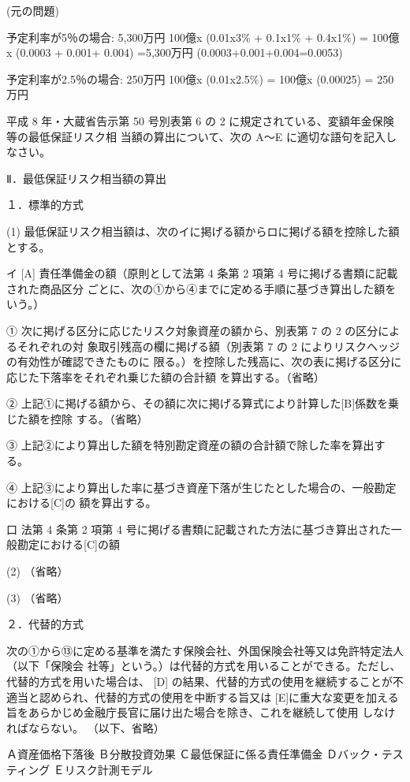 \documentclass[report,gutter=10mm,fore-edge=10mm,uplatex,dvipdfmx]{jlreq}
\begin{document}
(元の問題)

予定利率が5％の場合: 5,300万円
100億x (0.01x3\% + 0.1x1\% + 0.4x1\%) = 100億x (0.0003 + 0.001+ 0.004) =5,300万円
(0.0003+0.001+0.004=0.0053)

予定利率が2.5％の場合: 250万円
100億x (0.01x2.5\%) = 100億x (0.00025) = 250万円

平成 8 年・大蔵省告示第 50 号別表第 6 の 2 に規定されている、変額年金保険等の最低保証リスク相
当額の算出について、次の A～E に適切な語句を記入しなさい。

Ⅱ．最低保証リスク相当額の算出

１．標準的方式

(1) 最低保証リスク相当額は、次のイに掲げる額からロに掲げる額を控除した額とする。

イ [A] 責任準備金の額（原則として法第 4 条第 2 項第 4 号に掲げる書類に記載された商品区分
ごとに、次の①から④までに定める手順に基づき算出した額をいう。）

① 次に掲げる区分に応じたリスク対象資産の額から、別表第 7 の 2 の区分によるそれぞれの対
象取引残高の欄に掲げる額（別表第 7 の 2 によりリスクヘッジの有効性が確認できたものに
限る。）を控除した残高に、次の表に掲げる区分に応じた下落率をそれぞれ乗じた額の合計額
を算出する。（省略）

② 上記①に掲げる額から、その額に次に掲げる算式により計算した[B]係数を乗じた額を控除
する。（省略）

③ 上記②により算出した額を特別勘定資産の額の合計額で除した率を算出する。

④ 上記③により算出した率に基づき資産下落が生じたとした場合の、一般勘定における[C]の
額を算出する。

口 法第 4 条第 2 項第 4 号に掲げる書類に記載された方法に基づき算出された一般勘定における[C]の額

(2) （省略）

(3) （省略）

２．代替的方式

次の①から⑬に定める基準を満たす保険会社、外国保険会社等又は免許特定法人（以下「保険会
社等」という。）は代替的方式を用いることができる。ただし、代替的方式を用いた場合は、 [D]
の結果、代替的方式の使用を継続することが不適当と認められ、代替的方式の使用を中断する旨又は
[E]に重大な変更を加える旨をあらかじめ金融庁長官に届け出た場合を除き、これを継続して使用
しなければならない。
（以下、省略）

\answer{}
Ａ資産価格下落後
Ｂ分散投資効果
Ｃ最低保証に係る責任準備金
Ｄバック・テスティング
Ｅリスク計測モデル
\end{document}
